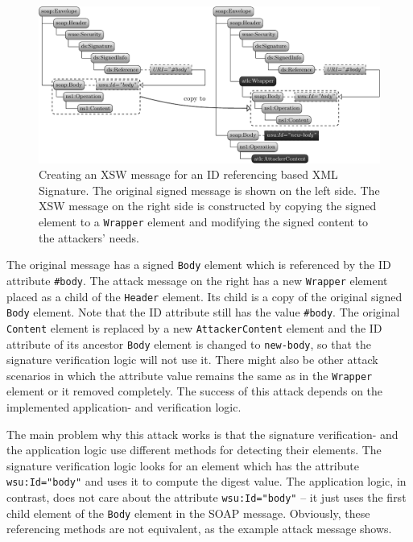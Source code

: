 \begin{figure}[ht]
    \begin{center}
        \includegraphics[width=\linewidth]{img/xsw_id}
    \end{center}
    \caption{Creating an XSW message for an ID referencing based XML Signature. 
The original signed message is shown on the left side.
The XSW message on the right side is constructed by copying the signed element to a \texttt{Wrapper} element and modifying the signed content to the attackers' needs.}
    \label{fig:xsw_id}
\end{figure}

The original message has a signed \texttt{Body} element which is referenced by the ID attribute \texttt{\#body}.
The attack message on the right has a new \texttt{Wrapper} element placed as a child of the \texttt{Header} element.
Its child is a copy of the original signed \texttt{Body} element.
Note that the ID attribute still has the value \texttt{\#body}.
The original \texttt{Content} element is replaced by a new \texttt{AttackerContent} element and the ID attribute of its ancestor \texttt{Body} element is changed to \texttt{new-body}, so that the signature verification logic will not use it.
There might also be other attack scenarios in which the attribute value remains the same as in the \texttt{Wrapper} element or it removed completely.
The success of this attack depends on the implemented application- and verification logic.

The main problem why this attack works is that the signature verification- and the application logic use different methods for detecting their elements.
The signature verification logic looks for an element which has the attribute \texttt{wsu:Id="body"} and uses it to compute the digest value.
The application logic, in contrast, does not care about the attribute \texttt{wsu:Id="body"} -- it just uses the first child element of the \texttt{Body} element in the SOAP message.
Obviously, these referencing methods are not equivalent, as the example attack message shows.

